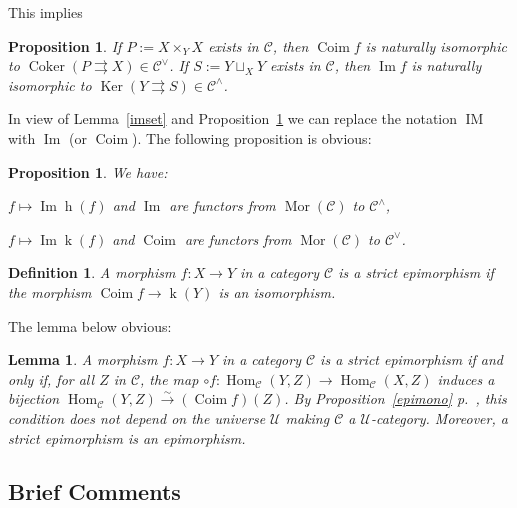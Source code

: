 \documentclass[12pt]{article}%
\newtheorem{lem}[thm]{Lemma}
\newtheorem{prop}[thm]{Proposition}
\newtheorem{df}[thm]{Definition}%
\theoremstyle{remark}
\theoremstyle{definition}
\newcommand{\C}{\mathcal C}
\newcommand{\U}{\mathcal U}
\newcommand{\parar}{\rightrightarrows}
\newcommand{\xr}{\xrightarrow}
\DeclareMathOperator{\Coim}{Coim}
\DeclareMathOperator{\Coker}{Coker}
\DeclareMathOperator{\Ima}{Im}
\DeclareMathOperator{\IM}{IM}
\DeclareMathOperator{\hy}{h}
\DeclareMathOperator{\ky}{k}
\DeclareMathOperator{\Hom}{Hom}%
\DeclareMathOperator{\Ker}{Ker}
\DeclareMathOperator{\Mor}{Mor}
\begin{document}
This implies 

\begin{prop}\label{coimim}
If $P:=X\times_YX$ exists in $\C$, then $\Coim f$ is naturally isomorphic to $\Coker(P\parar X)\in\C^\vee$. If $S:=Y\sqcup_XY$ exists in $\C$, then $\Ima f$ is naturally isomorphic to $\Ker(Y\parar S)\in\C^\wedge$. 
\end{prop} 

In view of Lemma~\ref{imset} and Proposition~\ref{coimim} we can replace the notation $\IM$ with $\Ima$ (or $\Coim$). The following proposition is obvious: 

\begin{prop}\label{fun}
We have: 

$f\mapsto\Ima\hy(f)$ and $\Ima$ are functors from $\Mor(\C)$ to $\C^\wedge$, 

$f\mapsto\Ima\ky(f)$ and $\Coim$ are functors from $\Mor(\C)$ to $\C^\vee$. 
\end{prop}

\begin{df}
A morphism $f:X\to Y$ in a category $\C$ is a {\em strict epimorphism}  if the morphism $\Coim f\to\ky(Y)$ is an isomorphism.
\end{df} 

The lemma below obvious:

\begin{lem}\label{strepi}
A morphism $f:X\to Y$ in a category $\C$ is a strict epimorphism if and only if, for all $Z$ in $\C$, the map $\circ f:\Hom_\C(Y,Z)\to\Hom_\C(X,Z)$ induces a bijection $\Hom_\C(Y,Z)\xr\sim(\Coim f)(Z)$. By Proposition~\ref{epimono} p.~\pageref{epimono}, this condition does not depend on the universe $\U$ making $\C$ a $\U$-category. Moreover, a strict epimorphism is an epimorphism. 
\end{lem} 


\subsection{Brief Comments}
\end{document}
